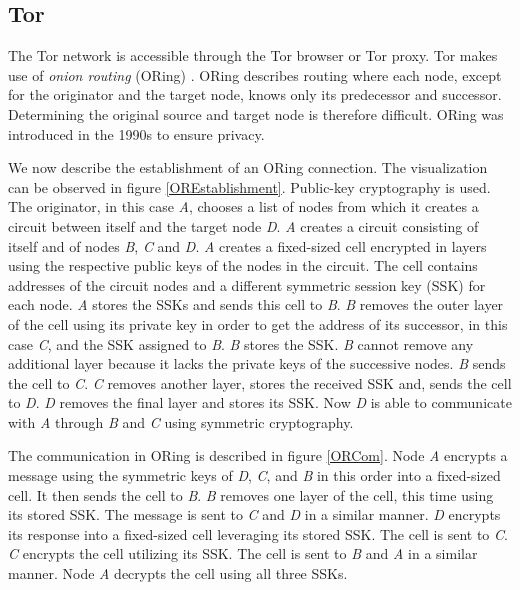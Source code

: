 \subsection{Tor} \label{tor}
The Tor network \cite{torIntro} is accessible through the Tor browser or Tor proxy. Tor makes use of \textit{onion routing} (ORing) \cite{onionRouting}. ORing describes routing where each node, except for the originator and the target node, knows only its predecessor and successor. Determining the original source and target node is therefore difficult. ORing was introduced in the 1990s to ensure privacy. 

We now describe the establishment of an ORing connection. The visualization can be observed in figure \ref{OREstablishment}. Public-key cryptography is used. The originator, in this case \textit{A}, chooses a list of nodes from which it creates a circuit between itself and the target node \textit{D}. \textit{A} creates a circuit consisting of itself and of nodes \textit{B}, \textit{C} and \textit{D}. \textit{A} creates a fixed-sized cell encrypted in layers using the respective public keys of the nodes in the circuit. The cell contains addresses of the circuit nodes and a different symmetric session key (SSK) for each node. \textit{A} stores the SSKs and sends this cell to \textit{B}. \textit{B} removes the outer layer of the cell using its private key in order to get the address of its successor, in this case \textit{C}, and the SSK assigned to \textit{B}. \textit{B} stores the SSK. \textit{B} cannot remove any additional layer because it lacks the private keys of the successive nodes. \textit{B} sends the cell to \textit{C}. \textit{C} removes another layer, stores the received SSK and, sends the cell to \textit{D}. \textit{D} removes the final layer and stores its SSK. Now \textit{D} is able to communicate with \textit{A} through \textit{B} and \textit{C} using symmetric cryptography. 

The communication in ORing is described in figure \ref{ORCom}. Node \textit{A} encrypts a message using the symmetric keys of \textit{D}, \textit{C}, and \textit{B} in this order into a fixed-sized cell. It then sends the cell to \textit{B}. \textit{B} removes one layer of the cell, this time using its stored SSK. The message is sent to \textit{C} and \textit{D} in a similar manner. \textit{D} encrypts its response into a fixed-sized cell leveraging its stored SSK. The cell is sent to \textit{C}. \textit{C} encrypts the cell utilizing its SSK. The cell is sent to \textit{B} and \textit{A} in a similar manner. Node \textit{A} decrypts the cell using all three SSKs. 

